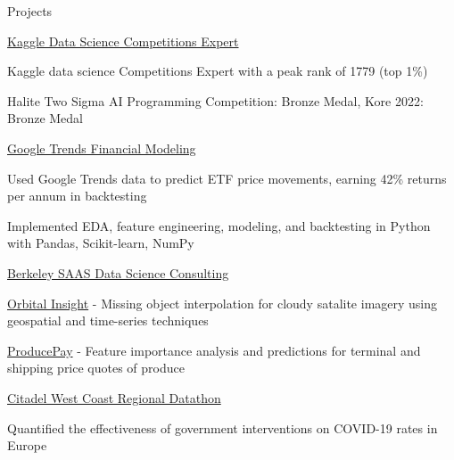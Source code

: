 \documentclass{resume} %
\begin{document}
\begin{rSection}{Projects}

\begin{rSubsection}{\href{https://www.kaggle.com/evilpegasus}{Kaggle Data Science Competitions Expert}}{}{}{}
    \item Kaggle data science Competitions Expert with a peak rank of 1779 (top 1\%)
    \item Halite Two Sigma AI Programming Competition: Bronze Medal, Kore 2022: Bronze Medal
\end{rSubsection}

\begin{rSubsection}{\href{https://github.com/evilpegasus/google-trends-financial-modeling/}{Google Trends Financial Modeling}}{}{}{}
    \item Used Google Trends data to predict ETF price movements, earning 42\% returns per annum in backtesting
    \item Implemented EDA, feature engineering, modeling, and backtesting in Python with Pandas, Scikit-learn, NumPy
\end{rSubsection}

\begin{rSubsection}{\href{https://www.producepay.com/}{Berkeley SAAS Data Science Consulting}}{}{}{}
    \item \href{https://orbitalinsight.com/}{Orbital Insight} - Missing object interpolation for cloudy satalite imagery using geospatial and time-series techniques
    \item \href{https://producepay.com/}{ProducePay} - Feature importance analysis and predictions for terminal and shipping price quotes of produce
\end{rSubsection}


\begin{rSubsection}{\href{https://github.com/evilpegasus/datathon-spring-2021}{Citadel West Coast Regional Datathon}}{}{}{}
    \item Quantified the effectiveness of government interventions on COVID-19 rates in Europe
\end{rSubsection}


\end{rSection}
\end{document}
